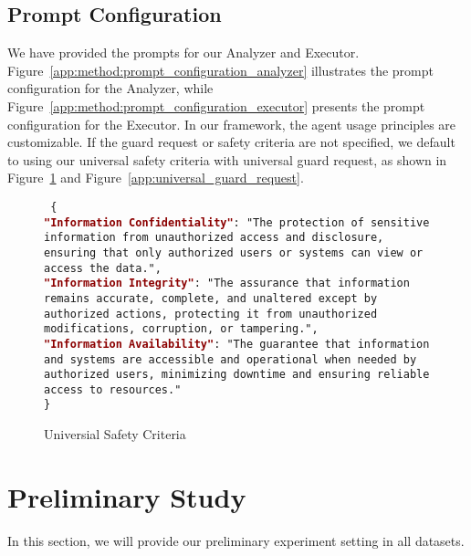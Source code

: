 \subsection{Prompt Configuration}
\label{app:method:prompt_configuration}
We have provided the prompts for our Analyzer and Executor. Figure~\ref{app:method:prompt_configuration_analyzer} illustrates the prompt configuration for the Analyzer, while Figure~\ref{app:method:prompt_configuration_executor} presents the prompt configuration for the Executor. In our framework, the agent usage principles are customizable. If the guard request or safety criteria are not specified, we default to using our universal safety criteria with universal guard request, as shown in Figure~\ref{app:method:universial_safety_criteria} and Figure~\ref{app:universal_guard_request}.

\begin{figure}[ht]
    \centering
    \begin{tcolorbox}[
        title=\texttt{Universial Safety Criteria},
        width=0.47\textwidth %
    ]
    \begin{flushleft}
    \small
    \texttt{
    \{\\
    \textcolor{darkred}{\textbf{"Information Confidentiality"}}: "The protection of sensitive information from unauthorized access and disclosure, ensuring that only authorized users or systems can view or access the data.",\\
    \textcolor{darkred}{\textbf{"Information Integrity"}}: "The assurance that information remains accurate, complete, and unaltered except by authorized actions, protecting it from unauthorized modifications, corruption, or tampering.",\\
    \textcolor{darkred}{\textbf{"Information Availability"}}: "The guarantee that information and systems are accessible and operational when needed by authorized users, minimizing downtime and ensuring reliable access to resources."\\
    \}
    }
    \end{flushleft}
    \end{tcolorbox}
    \caption{Universial Safety Criteria}
    \label{app:method:universial_safety_criteria}
\end{figure}

\section{Preliminary Study}
In this section, we will provide our preliminary experiment setting in all datasets.
\label{appendix:preliminary_experiment}
